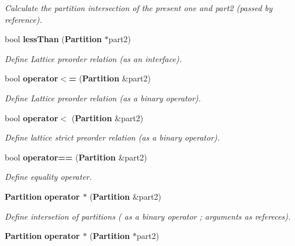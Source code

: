 \begin{CompactItemize}
\begin{CompactList}\small\item\em Calculate the partition intersection of the present one and part2 (passed by reference). \item\end{CompactList}\item 
bool {\bf less\-Than} ({\bf Partition} $\ast$part2)\label{classPartition_a56}

\begin{CompactList}\small\item\em Define Lattice preorder relation (as an interface). \item\end{CompactList}\item 
bool {\bf operator$<$=} ({\bf Partition} \&part2)\label{classPartition_a57}

\begin{CompactList}\small\item\em Define Lattice preorder relation (as a binary operator). \item\end{CompactList}\item 
bool {\bf operator$<$} ({\bf Partition} \&part2)\label{classPartition_a58}

\begin{CompactList}\small\item\em Define lattice strict preorder relation (as a binary operator). \item\end{CompactList}\item 
bool {\bf operator==} ({\bf Partition} \&part2)\label{classPartition_a59}

\begin{CompactList}\small\item\em Define equality operater. \item\end{CompactList}\item 
{\bf Partition} {\bf operator $\ast$} ({\bf Partition} \&part2)\label{classPartition_a60}

\begin{CompactList}\small\item\em Define intersetion of partitions ( as a binary operator ; arguments as refereces). \item\end{CompactList}\item 
{\bf Partition} {\bf operator $\ast$} ({\bf Partition} $\ast$part2)\label{classPartition_a61}


\end{CompactItemize}
